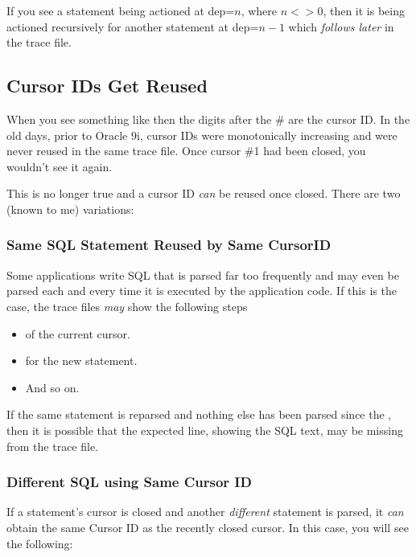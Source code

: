 If you see a statement being actioned at dep=$n$, where $n <> 0$, then it is being actioned recursively for another statement at dep=$n-1$ which \emph{follows later} in the trace file.

\subsection{Cursor IDs Get Reused}

When you see something like  then the digits after the \# are the cursor ID. In the old days, prior to Oracle 9i, cursor IDs were monotonically increasing and were never reused in the same trace file. Once cursor \#1 had been closed, you wouldn't see it again.

This is no longer true and a cursor ID \emph{can} be reused once closed. There are two (known to me) variations:

\subsubsection{Same SQL Statement Reused by Same CursorID}

Some applications write SQL that is parsed far too frequently and may even be parsed each and every time it is executed by the application code. If this is the case, the trace files \emph{may} show the following steps

\begin{itemize}
	\item {} of the current cursor.
	\item {} for the new statement.
	\item And so on.
\end{itemize}

If the same statement is reparsed and nothing else has been parsed since the , then it is possible that the expected  line, showing the SQL text, may be missing from the trace file.

\subsubsection{Different SQL using Same Cursor ID}

If a statement's cursor is closed and another \emph{different} statement is parsed, it \emph{can} obtain the same Cursor ID as the recently closed cursor. In this case, you will see the following:

